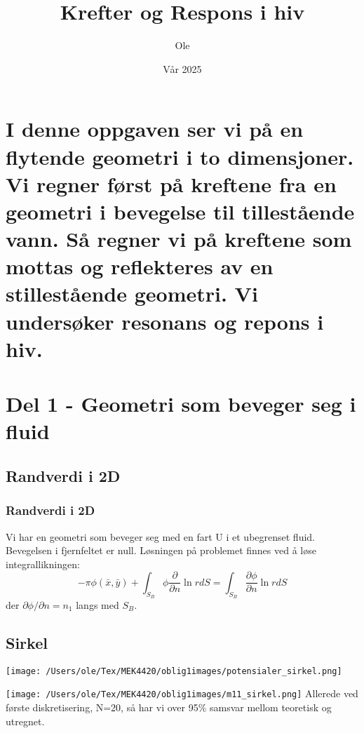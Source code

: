 \documentclass{beamer}
\title{Krefter og Respons i hiv}
\author{Ole}
\date{Vår 2025}
\begin{document}
\frame{\titlepage}

\section[Outline]{I denne oppgaven ser vi på en flytende geometri i to dimensjoner. Vi regner først på kreftene fra en geometri i bevegelse til tillestående vann. Så regner vi på kreftene som mottas og reflekteres av en stillestående geometri. Vi undersøker resonans og repons i hiv. }
\frame{\tableofcontents}

\section{Del 1 - Geometri som beveger seg i fluid}
\subsection{Randverdi i 2D}
\begin{frame}
  \frametitle{Randverdi i 2D}
  Vi har en geometri som beveger seg med en fart U i et ubegrenset fluid. Bevegelsen i fjernfeltet er null. 
Løsningen på problemet finnes ved å løse integrallikningen:
\begin{equation}
    -\pi \phi(\bar{x},\bar{y})  + \int_{S_B} \phi  \frac{\partial }{\partial n} \ln r dS = \int_{S_B}  \frac{\partial \phi}{\partial n} \ln r dS
\end{equation} %
der $\partial \phi / \partial n = n_1$ langs med $S_B$. %
\end{frame}
\subsection{Sirkel}
\begin{frame}
\texttt{[image: /Users/ole/Tex/MEK4420/oblig1images/potensialer\_sirkel.png]}
\end{frame}

\begin{frame}
{\texttt{[image: /Users/ole/Tex/MEK4420/oblig1images/m11\_sirkel.png]}}
Allerede ved første diskretisering, N=20, så har vi over 95\% samsvar mellom teoretisk og utregnet. 
\end{frame}
\end{document}
